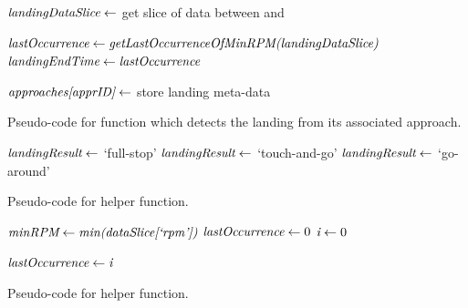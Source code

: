 \begin{algorithm}
\begin{algorithmic}[1]
            	\State $ \textit{landingDataSlice} \gets $ get slice of data between  and 
                
            	\State $ \textit{lastOccurrence} \gets \textit{getLastOccurrenceOfMinRPM(landingDataSlice)} $
                \State $ \textit{landingEndTime} \gets \textit{lastOccurrence} $
            \EndIf
            
            \State $ \textit{approaches[apprID]} \gets $ store landing meta-data
            \State \Return {}
        \EndFunction
        \end{algorithmic}
        \caption{Pseudo-code for function which detects the landing from its associated approach.}
        \label{alg:detect_landing}
    \end{algorithm}
    
    
    \begin{algorithm}
    	\begin{algorithmic}[1]
                    \State $ \textit{landingResult} \gets $ `full-stop'
                    \State $ \textit{landingResult} \gets $ `touch-and-go'
                \Else
                    \State $ \textit{landingResult} \gets $ `go-around'
                \EndIf
                \State \Return {}
            \EndFunction
        \end{algorithmic}
        \caption{Pseudo-code for  helper function.}
        \label{alg:landing_result_helper}
    \end{algorithm}
    
    
    \begin{algorithm}
    	\begin{algorithmic}[1]
        		\State $ \textit{minRPM} \gets \textit{min(dataSlice[`rpm'])} $
                \State $ \textit{lastOccurrence} \gets 0 $
                \State $ \textit{i} \gets 0 $
                
                 
						\State $ \textit{lastOccurrence} \gets \textit{i} $
                    \EndIf
                \EndWhile
                \State \Return {}
            \EndFunction
        \end{algorithmic}
        \caption{Pseudo-code for  helper function.}
        \label{alg:last_rpm_helper}
    \end{algorithm}
    
